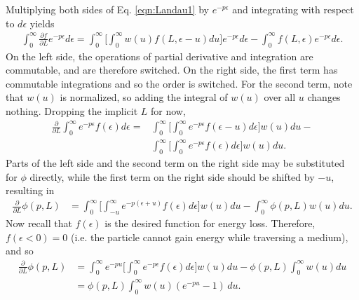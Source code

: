 Multiplying both sides of Eq. \eqref{eqn:Landau1} by $e^{-p\epsilon}$ and integrating with respect to $d\epsilon$ yields
\begin{align*}
\int_0 ^\infty \frac{\partial f}{\partial L} e^{-p\epsilon} d\epsilon = \int_0 ^\infty \Bigg [\int_0 ^\infty w(u) f(L,\epsilon-u) du \Bigg]e^{-p\epsilon} d\epsilon -  \int_0 ^\infty f(L,\epsilon) e^{-p\epsilon} d\epsilon.
\end{align*}
On the left side, the operations of partial derivative and integration are commutable, and are therefore switched. On the right side, the first term has commutable integrations and so the order is switched. For the second term, note that $w(u)$ is normalized, so adding the integral of $w(u)$ over all $u$ changes nothing. Dropping the implicit $L$ for now,
\begin{align*}
\frac{\partial}{\partial L}\int_0 ^\infty e^{-p\epsilon} f(\epsilon) d\epsilon = &\int_0 ^\infty \Bigg[\int_0 ^\infty e^{-p\epsilon} f(\epsilon-u)  d\epsilon \Bigg] w(u) du -\\
 & \int_0 ^\infty \Bigg[\int_0 ^\infty e^{-p\epsilon}f(\epsilon) d\epsilon \Bigg] w(u) du.
\end{align*}
Parts of the left side and the second term on the right side may be substituted for $\phi$ directly, while the first term on the right side should be shifted by $-u$, resulting in
\begin{align*}
\frac{\partial}{\partial L} \phi(p,L) &= \int_0 ^\infty \Bigg[\int_{-u} ^\infty e^{-p(\epsilon+u)} f(\epsilon)  d\epsilon \Bigg] w(u) du -\int_0 ^\infty \phi(p,L) w(u) du.
\end{align*}
Now recall that $f(\epsilon)$ is the desired function for energy loss. Therefore, $f(\epsilon<0)=0$ (i.e. the particle cannot gain energy while traversing a medium), and so
\begin{align}
\frac{\partial}{\partial L} \phi(p,L) &= \int_0 ^\infty e^{-pu}\Bigg[\int_{0} ^\infty e^{-p\epsilon} f(\epsilon)  d\epsilon \Bigg] w(u) du -\phi(p,L) \int_0 ^\infty w(u) du\nonumber\\
&=\phi(p,L)\int_0 ^\infty w(u)(e^{-pu}-1)\, du. \nonumber%
\end{align}

